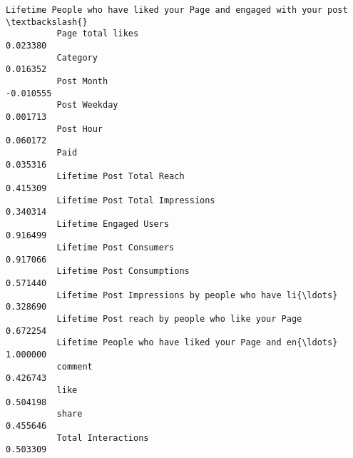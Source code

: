 \documentclass[11pt]{article}
\begin{document}
\begin{Verbatim}[commandchars=\\\{\}]
                                                              Lifetime People who have liked your Page and engaged with your post  \textbackslash{}
          Page total likes                                                                             0.023380                     
          Category                                                                                     0.016352                     
          Post Month                                                                                  -0.010555                     
          Post Weekday                                                                                 0.001713                     
          Post Hour                                                                                    0.060172                     
          Paid                                                                                         0.035316                     
          Lifetime Post Total Reach                                                                    0.415309                     
          Lifetime Post Total Impressions                                                              0.340314                     
          Lifetime Engaged Users                                                                       0.916499                     
          Lifetime Post Consumers                                                                      0.917066                     
          Lifetime Post Consumptions                                                                   0.571440                     
          Lifetime Post Impressions by people who have li{\ldots}                                           0.328690                     
          Lifetime Post reach by people who like your Page                                             0.672254                     
          Lifetime People who have liked your Page and en{\ldots}                                           1.000000                     
          comment                                                                                      0.426743                     
          like                                                                                         0.504198                     
          share                                                                                        0.455646                     
          Total Interactions                                                                           0.503309                     
          

\end{Verbatim}
\end{document}
